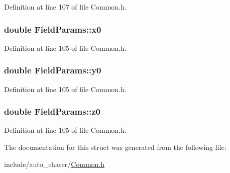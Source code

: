 Definition at line 107 of file Common.\+h.

\subsubsection[{\texorpdfstring{x0}{x0}}]{\setlength{\rightskip}{0pt plus 5cm}double Field\+Params\+::x0}\hypertarget{struct_field_params_ae702824fca4d3a4b4bbf4ac90084e3a7}{}\label{struct_field_params_ae702824fca4d3a4b4bbf4ac90084e3a7}


Definition at line 105 of file Common.\+h.

\subsubsection[{\texorpdfstring{y0}{y0}}]{\setlength{\rightskip}{0pt plus 5cm}double Field\+Params\+::y0}\hypertarget{struct_field_params_ae9d400dadcfaaff44706adae06664c83}{}\label{struct_field_params_ae9d400dadcfaaff44706adae06664c83}


Definition at line 105 of file Common.\+h.

\subsubsection[{\texorpdfstring{z0}{z0}}]{\setlength{\rightskip}{0pt plus 5cm}double Field\+Params\+::z0}\hypertarget{struct_field_params_a51178f64cc93a37d6d8f774228c24a0f}{}\label{struct_field_params_a51178f64cc93a37d6d8f774228c24a0f}


Definition at line 105 of file Common.\+h.



The documentation for this struct was generated from the following file\+:\begin{DoxyCompactItemize}
\item 
include/auto\+\_\+chaser/\hyperlink{_common_8h}{Common.\+h}\end{DoxyCompactItemize}

